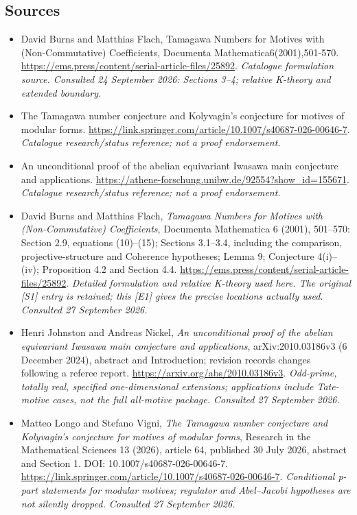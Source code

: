 \documentclass[11pt,a4paper]{article}
\numberwithin{equation}{section}
\begin{document}
\subsection{Sources}
\begin{itemize}\raggedright
\item[\textnormal{[S1]}]\hypertarget{source:30006700:1}{} David Burns and Matthias Flach, Tamagawa Numbers for Motives with (Non-Commutative) Coefficients, Documenta Mathematica6(2001),501-570.
\url{https://ems.press/content/serial-article-files/25892}.
{\small\textit{Catalogue formulation source. Consulted 24 September 2026: Sections 3--4; relative K-theory and extended boundary.}}
\item[\textnormal{[S2]}]\hypertarget{source:30006700:2}{} The Tamagawa number conjecture and Kolyvagin's conjecture for motives of modular forms.
\url{https://link.springer.com/article/10.1007/s40687-026-00646-7}.
{\small\textit{Catalogue research/status reference; not a proof endorsement.}}
\item[\textnormal{[S3]}]\hypertarget{source:30006700:3}{} An unconditional proof of the abelian equivariant Iwasawa main conjecture and applications.
\url{https://athene-forschung.unibw.de/92554?show_id=155671}.
{\small\textit{Catalogue research/status reference; not a proof endorsement.}}

\item[\textnormal{[E1]}]\hypertarget{extra:30006700:1}{} David Burns and Matthias Flach, \emph{Tamagawa Numbers for Motives with (Non-Commutative) Coefficients}, Documenta Mathematica 6 (2001), 501--570: Section 2.9, equations (10)--(15); Sections 3.1--3.4, including the comparison, projective-structure and Coherence hypotheses; Lemma 9; Conjecture 4(i)--(iv); Proposition 4.2 and Section 4.4.
\url{https://ems.press/content/serial-article-files/25892}.
{\small\textit{Detailed formulation and relative K-theory used here. The original [S1] entry is retained; this [E1] gives the precise locations actually used. Consulted 27 September 2026.}}
\item[\textnormal{[E2]}]\hypertarget{extra:30006700:2}{} Henri Johnston and Andreas Nickel, \emph{An unconditional proof of the abelian equivariant Iwasawa main conjecture and applications}, arXiv:2010.03186v3 (6 December 2024), abstract and Introduction; revision records changes following a referee report.
\url{https://arxiv.org/abs/2010.03186v3}.
{\small\textit{Odd-prime, totally real, specified one-dimensional extensions; applications include Tate-motive cases, not the full all-motive package. Consulted 27 September 2026.}}
\item[\textnormal{[E3]}]\hypertarget{extra:30006700:3}{} Matteo Longo and Stefano Vigni, \emph{The Tamagawa number conjecture and Kolyvagin's conjecture for motives of modular forms}, Research in the Mathematical Sciences 13 (2026), article 64, published 30 July 2026, abstract and Section 1. DOI: 10.1007/s40687-026-00646-7.
\url{https://link.springer.com/article/10.1007/s40687-026-00646-7}.
{\small\textit{Conditional p-part statements for modular motives; regulator and Abel--Jacobi hypotheses are not silently dropped. Consulted 27 September 2026.}}
\end{itemize}
\end{document}
